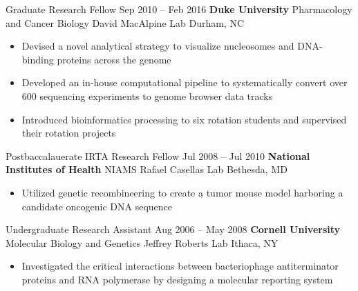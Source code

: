 
\begin{resentries}

  \resentrybeta
    {Graduate Research Fellow}
    {Sep 2010 -- Feb 2016}
    {\textbf{Duke University} \xspace \bullet \xspace \xspace Pharmacology and Cancer Biology \xspace \bullet \xspace \xspace David MacAlpine Lab} %
    {Durham, NC} %
    {
      \begin{itemize}[leftmargin=*, itemsep=-1.5mm] %
        \item{Devised a novel analytical strategy to visualize nucleosomes and DNA-binding proteins across the genome}
        \item{Developed an in-house computational pipeline to systematically convert over 600 sequencing experiments to genome browser data tracks}
        \item{Introduced bioinformatics processing to six rotation students and supervised their rotation projects}
      \end{itemize}
    }

  \resentrybeta
    {Postbaccalauerate IRTA Research Fellow}
    {Jul 2008 -- Jul 2010}
    {\textbf{National Institutes of Health} \xspace \bullet \xspace \xspace NIAMS \xspace \bullet \xspace \xspace Rafael Casellas Lab}
    {Bethesda, MD}
    {
      \begin{itemize}[leftmargin=*, itemsep=-1.5mm]
        \item{Utilized genetic recombineering to create a tumor mouse model harboring a candidate oncogenic DNA sequence}
      \end{itemize}
    }

  \resentrybeta
    {Undergraduate Research Assistant}
    {Aug 2006 -- May 2008}
    {\textbf{Cornell University} \xspace \bullet \xspace \xspace Molecular Biology and Genetics \xspace \bullet \xspace \xspace Jeffrey Roberts Lab}
    {Ithaca, NY}
    {
      \begin{itemize}[leftmargin=*, itemsep=-1.5mm]
        \item{Investigated the critical interactions between bacteriophage antiterminator proteins and RNA polymerase by designing a molecular reporting system}
      \end{itemize}
    }

\end{resentries}
